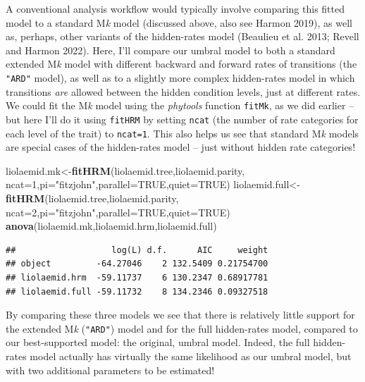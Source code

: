 \documentclass[fleqn,10pt,lineno]{wlpeerj} %
\newenvironment{Shaded}{\begin{snugshade}}{\end{snugshade}}
\newcommand{\AttributeTok}[1]{\textcolor[rgb]{0.13,0.29,0.53}{#1}}
\newcommand{\ConstantTok}[1]{\textcolor[rgb]{0.56,0.35,0.01}{#1}}
\newcommand{\DecValTok}[1]{\textcolor[rgb]{0.00,0.00,0.81}{#1}}
\newcommand{\FunctionTok}[1]{\textcolor[rgb]{0.13,0.29,0.53}{\textbf{#1}}}
\newcommand{\NormalTok}[1]{#1}
\newcommand{\OtherTok}[1]{\textcolor[rgb]{0.56,0.35,0.01}{#1}}
\newcommand{\StringTok}[1]{\textcolor[rgb]{0.31,0.60,0.02}{#1}}
\begin{document}
A conventional analysis workflow would typically involve comparing this fitted model to a standard M\emph{k} model (discussed above, also see Harmon 2019), as well as, perhaps, other variants of the hidden-rates model (Beaulieu et al. 2013; Revell and Harmon 2022). Here, I'll compare our umbral model to both a standard extended M\emph{k} model with different backward and forward rates of transitions (the \texttt{"ARD"} model), as well as to a slightly more complex hidden-rates model in which transitions \emph{are} allowed between the hidden condition levels, just at different rates. We could fit the M\emph{k} model using the \emph{phytools} function \texttt{fitMk}, as we did earlier -- but here I'll do it using \texttt{fitHRM} by setting \texttt{ncat} (the number of rate categories for each level of the trait) to \texttt{ncat=1}. This also helps us see that standard M\emph{k} models are special cases of the hidden-rates model -- just without hidden rate categories!

\begin{Shaded}
\begin{Highlighting}[]
\NormalTok{liolaemid.mk}\OtherTok{\textless{}{-}}\FunctionTok{fitHRM}\NormalTok{(liolaemid.tree,liolaemid.parity,}
  \AttributeTok{ncat=}\DecValTok{1}\NormalTok{,}\AttributeTok{pi=}\StringTok{"fitzjohn"}\NormalTok{,}\AttributeTok{parallel=}\ConstantTok{TRUE}\NormalTok{,}\AttributeTok{quiet=}\ConstantTok{TRUE}\NormalTok{)}
\NormalTok{liolaemid.full}\OtherTok{\textless{}{-}}\FunctionTok{fitHRM}\NormalTok{(liolaemid.tree,liolaemid.parity,}
  \AttributeTok{ncat=}\DecValTok{2}\NormalTok{,}\AttributeTok{pi=}\StringTok{"fitzjohn"}\NormalTok{,}\AttributeTok{parallel=}\ConstantTok{TRUE}\NormalTok{,}\AttributeTok{quiet=}\ConstantTok{TRUE}\NormalTok{)}
\FunctionTok{anova}\NormalTok{(liolaemid.mk,liolaemid.hrm,liolaemid.full)}
\end{Highlighting}
\end{Shaded}

\begin{verbatim}
##                   log(L) d.f.      AIC     weight
## object         -64.27046    2 132.5409 0.21754700
## liolaemid.hrm  -59.11737    6 130.2347 0.68917781
## liolaemid.full -59.11732    8 134.2346 0.09327518
\end{verbatim}

By comparing these three models we see that there is relatively little support for the extended M\emph{k} (\texttt{"ARD"}) model and for the full hidden-rates model, compared to our best-supported model: the original, umbral model. Indeed, the full hidden-rates model actually has virtually the same likelihood as our umbral model, but with two additional parameters to be estimated!
\end{document}
